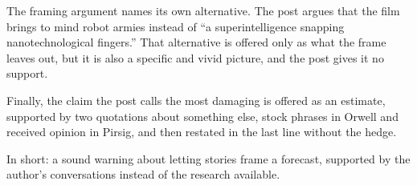 \begin{afterword}
The framing argument names its own alternative. The post argues that the film brings to mind robot armies instead of ``a superintelligence snapping nanotechnological fingers.'' That alternative is offered only as what the frame leaves out, but it is also a specific and vivid picture, and the post gives it no support.

Finally, the claim the post calls the most damaging is offered as an estimate, supported by two quotations about something else, stock phrases in Orwell and received opinion in Pirsig, and then restated in the last line without the hedge.

In short: a sound warning about letting stories frame a forecast, supported by the author's conversations instead of the research available.
\end{afterword}

